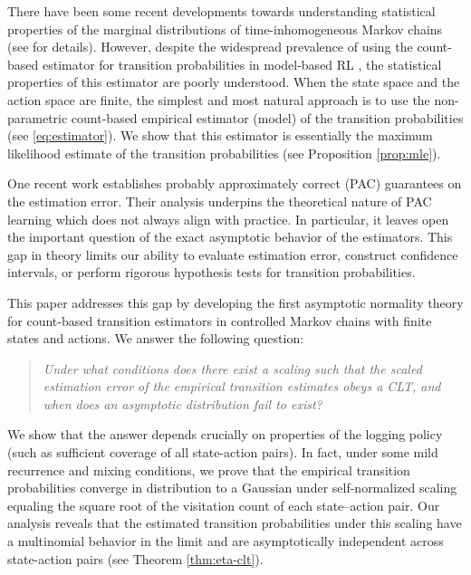 \documentclass[twoside,11pt]{article}
\numberwithin{equation}{section}
\begin{document}
There have been some recent developments towards understanding statistical properties of the marginal distributions of time-inhomogeneous Markov chains (see \cite{dolgopyat_local_2023} for details). However, despite the widespread prevalence of using the count-based estimator for transition probabilities in model-based RL \citep{mannor2005empirical, li2022settling, zhu2024uncertainty}, the statistical properties of this estimator are poorly understood.  
When the state space and the action space are finite, the simplest and most natural approach is to use the non-parametric count-based empirical estimator (model) of the transition probabilities (see \cref{eq:estimator}). 
We show that this estimator is essentially the maximum likelihood estimate of the transition probabilities (see Proposition \ref{prop:mle}).


One recent work \citep{banerjee2025off} establishes probably approximately correct (PAC) \citep{valiant_theory_1984} guarantees on the estimation error. Their analysis underpins the theoretical nature of PAC learning which does not always align with practice. In particular, it leaves open the important question of the exact asymptotic behavior of the estimators. This gap in theory limits our ability to evaluate estimation error, construct confidence intervals, or perform rigorous hypothesis tests for transition probabilities.

This paper addresses this gap by developing the first asymptotic normality theory for count-based transition estimators in controlled Markov chains with finite states and actions. 
We answer the following question:
\begin{quote}
    \centering
    \textit{Under what conditions does there exist a scaling such that the scaled estimation error of the empirical transition estimates obeys a CLT, and when does an asymptotic distribution fail to exist?}
\end{quote}

We show that the answer depends crucially on properties of the logging policy (such as sufficient coverage of all state-action pairs). 
In fact, under some mild recurrence and mixing conditions, we prove that the empirical transition probabilities converge in distribution to a Gaussian under self-normalized scaling equaling the square root of the visitation count of each state–action pair. 
Our analysis reveals that the estimated transition probabilities under this scaling have a multinomial behavior in the limit and are asymptotically independent across state-action pairs (see Theorem \ref{thm:eta-clt}).
\end{document}

